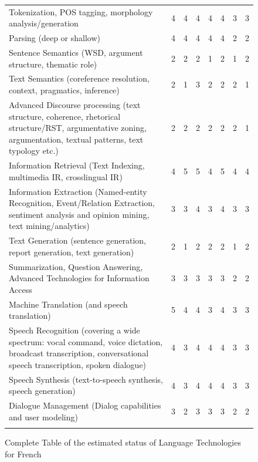 \begin{multicols}{2}
\begin{figure}[!ht]
\begin{tabular}{>{\columncolor{orange1}}p{.50\linewidth}@{\hspace*{6mm}}c@{\hspace*{6mm}}c@{\hspace*{6mm}}c@{\hspace*{6mm}}c@{\hspace*{6mm}}c@{\hspace*{6mm}}c@{\hspace*{6mm}}c}
  Tokenization, POS tagging, morphology analysis/generation &4&4&4&4&4&3&3 \\ \addlinespace
  Parsing (deep or shallow) &4&4&4&4&4&2&2\\ \addlinespace
  Sentence Semantics (WSD, argument structure, thematic role) &2&2&2&1&2&1&2\\ \addlinespace
  Text Semantics (coreference resolution, context, pragmatics, inference) &2&1&3&2&2&2&1\\ \addlinespace
  Advanced Discourse processing (text structure, coherence, rhetorical structure/RST, argumentative zoning, argumentation, textual patterns, text typology etc.) &2&2&2&2&2&2&1\\ \addlinespace
  Information Retrieval (Text Indexing, multimedia IR, crosslingual IR) &4&5&5&4&5&4&4\\ \addlinespace
  Information Extraction (Named-entity Recognition, Event/Relation Extraction, sentiment analysis and opinion mining, text mining/analytics)&3&3&4&3&4&3&3\\ \addlinespace
  Text Generation (sentence generation, report generation, text generation) &2&1&2&2&2&1&2\\ \addlinespace
  Summarization, Question Answering, Advanced Technologies for Information Access &3&3&3&3&3&2&2\\ \addlinespace
  Machine Translation (and speech translation) &5&4&4&3&4&3&3\\ \addlinespace
  Speech Recognition (covering a wide spectrum: vocal command, voice dictation, broadcast transcription, conversational speech transcription, spoken dialogue) &4&3&4&4&4&3&3\\ \addlinespace
  Speech Synthesis (text-to-speech synthesis, speech generation)&4&3&4&4&4&3&3\\ \addlinespace
  Dialogue Management (Dialog capabilities and user modeling)&3&2&3&3&3&2&2\\ \addlinespace
  \end{tabular}
  \caption{Complete Table of the estimated status of Language Technologies for French}
  \label{fig:lrlttable_fr_1}
\end{figure}


\end{multicols}
